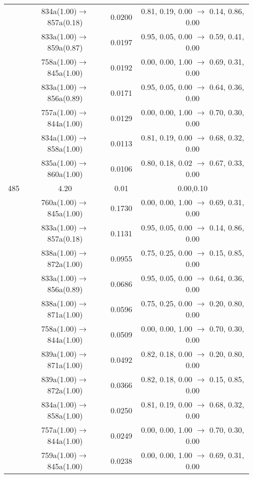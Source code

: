 \documentclass[10pt,a4paper]{article}
\begin{document}
\begin{longtable}{c|c|c|c}
 	& 834a(1.00)$\rightarrow$857a(0.18) &	 0.0200 &	 0.81, 0.19, 0.00 $\rightarrow$ 0.14, 0.86, 0.00 \\ 
 	& 833a(1.00)$\rightarrow$859a(0.87) &	 0.0197 &	 0.95, 0.05, 0.00 $\rightarrow$ 0.59, 0.41, 0.00 \\ 
 	& 758a(1.00)$\rightarrow$845a(1.00) &	 0.0192 &	 0.00, 0.00, 1.00 $\rightarrow$ 0.69, 0.31, 0.00 \\ 
 	& 833a(1.00)$\rightarrow$856a(0.89) &	 0.0171 &	 0.95, 0.05, 0.00 $\rightarrow$ 0.64, 0.36, 0.00 \\ 
 	& 757a(1.00)$\rightarrow$844a(1.00) &	 0.0129 &	 0.00, 0.00, 1.00 $\rightarrow$ 0.70, 0.30, 0.00 \\ 
 	& 834a(1.00)$\rightarrow$858a(1.00) &	 0.0113 &	 0.81, 0.19, 0.00 $\rightarrow$ 0.68, 0.32, 0.00 \\ 
 	& 835a(1.00)$\rightarrow$860a(1.00) &	 0.0106 &	 0.80, 0.18, 0.02 $\rightarrow$ 0.67, 0.33, 0.00 \\ 
 \hline485 &	 4.20 &	 0.01 &	 0.00,0.10 \\ 
  	& 760a(1.00)$\rightarrow$845a(1.00) &	 0.1730 &	 0.00, 0.00, 1.00 $\rightarrow$ 0.69, 0.31, 0.00 \\ 
 	& 833a(1.00)$\rightarrow$857a(0.18) &	 0.1131 &	 0.95, 0.05, 0.00 $\rightarrow$ 0.14, 0.86, 0.00 \\ 
 	& 838a(1.00)$\rightarrow$872a(1.00) &	 0.0955 &	 0.75, 0.25, 0.00 $\rightarrow$ 0.15, 0.85, 0.00 \\ 
 	& 833a(1.00)$\rightarrow$856a(0.89) &	 0.0686 &	 0.95, 0.05, 0.00 $\rightarrow$ 0.64, 0.36, 0.00 \\ 
 	& 838a(1.00)$\rightarrow$871a(1.00) &	 0.0596 &	 0.75, 0.25, 0.00 $\rightarrow$ 0.20, 0.80, 0.00 \\ 
 	& 758a(1.00)$\rightarrow$844a(1.00) &	 0.0509 &	 0.00, 0.00, 1.00 $\rightarrow$ 0.70, 0.30, 0.00 \\ 
 	& 839a(1.00)$\rightarrow$871a(1.00) &	 0.0492 &	 0.82, 0.18, 0.00 $\rightarrow$ 0.20, 0.80, 0.00 \\ 
 	& 839a(1.00)$\rightarrow$872a(1.00) &	 0.0366 &	 0.82, 0.18, 0.00 $\rightarrow$ 0.15, 0.85, 0.00 \\ 
 	& 834a(1.00)$\rightarrow$858a(1.00) &	 0.0250 &	 0.81, 0.19, 0.00 $\rightarrow$ 0.68, 0.32, 0.00 \\ 
 	& 757a(1.00)$\rightarrow$844a(1.00) &	 0.0249 &	 0.00, 0.00, 1.00 $\rightarrow$ 0.70, 0.30, 0.00 \\ 
 	& 759a(1.00)$\rightarrow$845a(1.00) &	 0.0238 &	 0.00, 0.00, 1.00 $\rightarrow$ 0.69, 0.31, 0.00 \\ 

\end{longtable}
\end{document}
